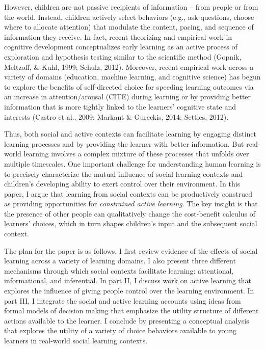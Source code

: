 \documentclass[a4paper,man,apacite,floatsintext]{apa6}
\begin{document}
However, children are not passive recipients of information -- from
people or from the world. Instead, children actively select behaviors
(e.g., ask questions, choose where to allocate attention) that modulate
the content, pacing, and sequence of information they receive. In fact,
recent theorizing and empirical work in cognitive development
conceptualizes early learning as an active process of exploration and
hypothesis testing similar to the scientific method (Gopnik, Meltzoff,
\& Kuhl, 1999; Schulz, 2012). Moreover, recent empirical work across a
variety of domains (education, machine learning, and cognitive science)
has begun to explore the benefits of self-directed choice for speeding
learning outcomes via an increase in attention/arousal (CITE) during
learning or by providing better information that is more tightly linked
to the learners' cognitive state and interests (Castro et al., 2009;
Markant \& Gureckis, 2014; Settles, 2012).

Thus, both social and active contexts can facilitate learning by
engaging distinct learning processes and by providing the learner with
better information. But real-world learning involves a complex mixture
of these processes that unfolds over multiple timescales. One important
challenge for understanding human learning is to precisely characterize
the mutual influence of social learning contexts and children's
developing ability to exert control over their environment. In this
paper, I argue that learning from social contexts can be productively
construed as providing opportunities for \emph{constrained active
learning}. The key insight is that the presence of other people can
qualitatively change the cost-benefit calculus of learners' choices,
which in turn shapes children's input and the subsequent social context.

The plan for the paper is as follows. I first review evidence of the
effects of social learning across a variety of learning domains. I also
present three different mechanisms through which social contexts
facilitate learning: attentional, informational, and inferential. In
part II, I discuss work on active learning that explores the influence
of giving people control over the learning environment. In part III, I
integrate the social and active learning accounts using ideas from
formal models of decision making that emphasize the utility structure of
different actions available to the learner. I conclude by presenting a
conceptual analysis that explores the utility of a variety of choice
behaviors available to young learners in real-world social learning
contexts.
\end{document}
